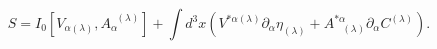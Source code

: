 \begin{equation}
S=I_{0}\left[ V_{\alpha (\lambda )},A_{\alpha }^{\;\;(\lambda )}\right]
+\int d^{3}x\left( V^{*\alpha (\lambda )}\partial _{\alpha }\eta _{(\lambda
)}+A_{\;\;\;(\lambda )}^{*\alpha }\partial _{\alpha }C^{(\lambda )}\right) .
\label{bf48}
\end{equation}

